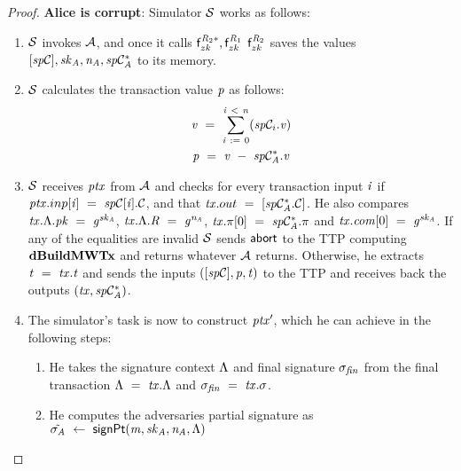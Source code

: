 \begin{proof}
    \textbf{Alice is corrupt}: Simulator $\mathcal{S}$ works as follows:
    \begin{enumerate}
        \item $\mathcal{S}$ invokes $\mathcal{A}$, and once it calls $\mathsf{f}^{\mathit{R}_2*}_{zk}, \mathsf{f}^{\mathit{R}_1}_{zk}$ $\mathsf{f}^{\mathit{R}_2}_{zk}$ saves the values $[\mathit{sp}\mathcal{C}], \mathit{sk}_{\mathit{A}}, \mathit{\mathit{n}_{\mathit{A}}}, \mathit{sp}\mathcal{C}_{\mathit{A}}^*$ to its memory.
        \item $\mathcal{S}$ calculates the transaction value $\mathit{p}$ as follows:
        \begin{gather*}
            \mathit{v} ~=~ \sum_{\mathit{i} ~:=~ 0}^{\mathit{i} ~<~ \mathit{n}}(\mathit{sp}\mathcal{C}_i.\mathit{v}) \\
            \mathit{p} ~=~ \mathit{v} ~-~ \mathit{sp}\mathcal{C}_{\mathit{A}}^*.\mathit{v}
        \end{gather*}
        \item $\mathcal{S}$ receives $\mathit{ptx}$ from $\mathcal{A}$ and checks for every transaction input $\mathit{i}$ if $\mathit{ptx}.inp[\mathit{i}] ~=~ \mathit{sp}\mathcal{C}[\mathit{i}].\mathcal{C}$, and that $\mathit{tx}.out ~=~ [\mathit{sp}\mathcal{C}_{\mathit{A}}^*.\mathcal{C}]$.
        He also compares $\mathit{tx}.\Lambda.\mathit{pk} ~=~ \mathit{g}^{\mathit{sk}_{\mathit{A}}}$, $\mathit{tx}.\Lambda.\mathit{R} ~=~ \mathit{g}^{\mathit{\mathit{n}_{\mathit{A}}}}$, $\mathit{tx}.\pi[0] ~=~ \mathit{sp}\mathcal{C}_{\mathit{A}}^*.\pi$ and $\mathit{tx}.\mathit{com}[0] ~=~ \mathit{g}^{\mathit{sk}_{\mathit{A}}}$.
        If any of the equalities are invalid $\mathcal{S}$ sends $\mathsf{abort}$ to the TTP computing $\mathbf{dBuildMWTx}$ and returns whatever $\mathcal{A}$ returns.
        Otherwise, he extracts $\mathit{t} ~=~ \mathit{tx}.\mathit{t}$ and sends the inputs $([\mathit{sp}\mathcal{C}], \mathit{p}, \mathit{t})$ to the TTP and receives back the outputs $(\mathit{tx}, \mathit{sp}\mathcal{C}_{\mathit{A}}^*)$.
        \item The simulator's task is now to construct ${\mathit{ptx}}'$, which he can achieve in the following steps:
        \begin{enumerate}
            \item He takes the signature context $\Lambda$ and final signature $\sigma_{\mathit{fin}}$ from the final transaction $\Lambda ~=~ \mathit{tx}.\Lambda$ and $\sigma_{\mathit{fin}} ~=~ \mathit{tx}.\sigma$.
            \item He computes the adversaries partial signature as $\tilde{\sigma_{\mathit{A}}} ~\leftarrow~ \mathsf{signPt}(\mathit{m}, \mathit{sk}_{\mathit{A}}, \mathit{\mathit{n}_{\mathit{A}}}, \Lambda)$

\end{enumerate}
\end{enumerate}
\end{proof}
